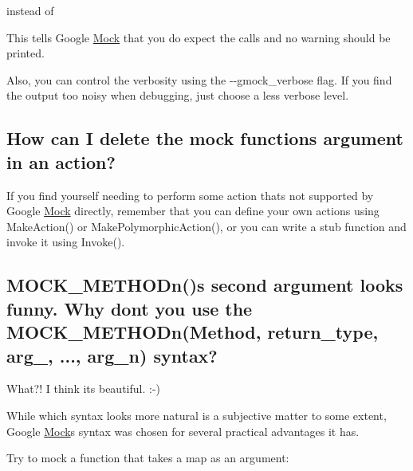 \begin{DoxyCode}{0}
\end{DoxyCode}


instead of


\begin{DoxyCode}{0}
\end{DoxyCode}


This tells Google \mbox{\hyperlink{class_mock}{Mock}} that you do expect the calls and no warning should be printed.

Also, you can control the verbosity using the {\ttfamily -\/-\/gmock\+\_\+verbose} flag. If you find the output too noisy when debugging, just choose a less verbose level.

\subsection*{How can I delete the mock function\textquotesingle{}s argument in an action?}

If you find yourself needing to perform some action that\textquotesingle{}s not supported by Google \mbox{\hyperlink{class_mock}{Mock}} directly, remember that you can define your own actions using Make\+Action() or Make\+Polymorphic\+Action(), or you can write a stub function and invoke it using Invoke().

\subsection*{M\+O\+C\+K\+\_\+\+M\+E\+T\+H\+O\+Dn()\textquotesingle{}s second argument looks funny. Why don\textquotesingle{}t you use the M\+O\+C\+K\+\_\+\+M\+E\+T\+H\+O\+Dn(\+Method, return\+\_\+type, arg\+\_, ..., arg\+\_\+n) syntax?}

What?! I think it\textquotesingle{}s beautiful. \+:-\/)

While which syntax looks more natural is a subjective matter to some extent, Google \mbox{\hyperlink{class_mock}{Mock}}\textquotesingle{}s syntax was chosen for several practical advantages it has.

Try to mock a function that takes a map as an argument\+: 
\begin{DoxyCode}{0}
\end{DoxyCode}


